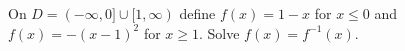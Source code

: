 On $D=(-\infty,0]\cup[1,\infty)$ define $f(x)=1-x$ for $x\le0$ and $f(x)=-(x-1)^2$ for $x\ge1$. Solve $f(x)=f^{-1}(x)$.
